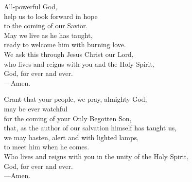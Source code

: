 \prayer


\begin{prayerverse}
All-powerful God,\\
help us to look forward in hope\\
to the coming of our Savior.\\
May we live as he has taught,\\
ready to welcome him with burning love.\\
We ask this through Jesus Christ our Lord,\\
who lives and reigns with you and the Holy Spirit,\\
God, for ever and ever.\\
{\color{red}---\thinspace}Amen.
\end{prayerverse}


\begin{prayerverse}
Grant that your people, we pray, almighty God,\\
may be ever watchful\\
for the coming of your Only Begotten Son,\\
that, as the author of our salvation himself has taught us,\\
we may hasten, alert and with lighted lamps,\\
to meet him when he comes.\\
Who lives and reigns with you in the unity of the Holy Spirit,\\
God, for ever and ever.\\
{\color{red}---\thinspace}Amen.
\end{prayerverse}

